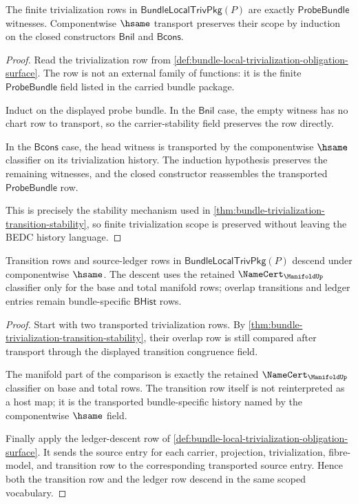 \begin{theorem}
\label{thm:bundle-trivialization-probebundle-scope}
The finite trivialization rows in $\mathsf{BundleLocalTrivPkg}(P)$ are exactly
$\mathsf{ProbeBundle}$ witnesses. Componentwise $\hsame$ transport preserves
their scope by induction on the closed constructors $\mathsf{Bnil}$ and
$\mathsf{Bcons}$.
\end{theorem}
\begin{proof}
Read the trivialization row from
\autoref{def:bundle-local-trivialization-obligation-surface}. The row is not an
external family of functions: it is the finite $\mathsf{ProbeBundle}$ field
listed in the carried bundle package.

Induct on the displayed probe bundle. In the $\mathsf{Bnil}$ case, the empty
witness has no chart row to transport, so the carrier-stability field preserves
the row directly.

In the $\mathsf{Bcons}$ case, the head witness is transported by the
componentwise $\hsame$ classifier on its trivialization history. The induction
hypothesis preserves the remaining witnesses, and the closed constructor
reassembles the transported $\mathsf{ProbeBundle}$ row.

This is precisely the stability mechanism used in
\autoref{thm:bundle-trivialization-transition-stability}, so finite
trivialization scope is preserved without leaving the BEDC history language.
\end{proof}

\begin{theorem}
\label{thm:bundle-transition-ledger-scope}
Transition rows and source-ledger rows in $\mathsf{BundleLocalTrivPkg}(P)$
descend under componentwise $\hsame$. The descent uses the retained
$\NameCert_{\ManifoldUp}$ classifier only for the base and total manifold rows;
overlap transitions and ledger entries remain bundle-specific
$\mathsf{BHist}$ rows.
\end{theorem}
\begin{proof}
Start with two transported trivialization rows. By
\autoref{thm:bundle-trivialization-transition-stability}, their overlap row is
still compared after transport through the displayed transition congruence
field.

The manifold part of the comparison is exactly the retained
$\NameCert_{\ManifoldUp}$ classifier on base and total rows. The transition row
itself is not reinterpreted as a host map; it is the transported
bundle-specific history named by the componentwise $\hsame$ field.

Finally apply the ledger-descent row of
\autoref{def:bundle-local-trivialization-obligation-surface}. It sends the
source entry for each carrier, projection, trivialization, fibre-model, and
transition row to the corresponding transported source entry. Hence both the
transition row and the ledger row descend in the same scoped vocabulary.
\end{proof}


